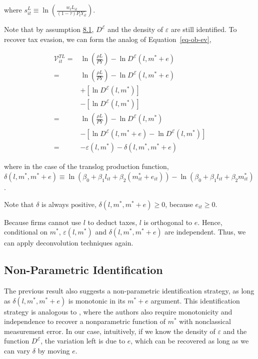 \documentclass[
  12pt]{article}
\theoremstyle{definition}
\theoremstyle{remark}
\begin{document}
where
\(s_{it}^{L} \equiv\ln\left(\frac{w_t L_{it}}{(1-\tau)P_{t}Y_{it}}\right)\).

Note that by assumption \hyperref[ass-non-ev]{8.1}, \(D^{\mathcal{E}}\)
and the density of \(\varepsilon\) are still identified. To recover tax
evasion, we can form the analog of Equation~\ref{eq-ob-ev},

\[
\begin{aligned}
\mathcal{V}_{it}^{TL} =&\ln\left(\frac{\rho L}{PY}\right)-\ln D^{\mathcal{E}}(l,m^*+e)\\
    =&\ln\left(\frac{\rho L}{PY}\right)-\ln D^{\mathcal{E}}(l,m^*+e)\\
    &+\left[\ln D^{\mathcal{E}}(l,m^*)\right]\\
    &-\left[\ln D^{\mathcal{E}}(l,m^*)\right] \\
    =&\ln\left(\frac{\rho L}{PY}\right)-\ln D^{\mathcal{E}}(l,m^*) \\
    &-\left[\ln D^{\mathcal{E}}(l,m^*+e)-\ln D^{\mathcal{E}}(l,m^*)\right]\\
    =& -\varepsilon(l,m^*) - \delta(l,m^*,m^*+e)
\end{aligned}
\]

where in the case of the translog production function,
\(\delta(l,m^*,m^*+e)\equiv \ln \left(\beta_0+\beta_1l_{it}+\beta_2(m^*_{it}+e_{it})\right)-\ln \left(\beta_0+\beta_1l_{it}+\beta_2m^*_{it}\right)\).

Note that \(\delta\) is always positive, \(\delta(l,m^*,m^*+e)\ge0\),
because \(e_{it}\ge0\).

Because firms cannot use \(l\) to deduct taxes, \(l\) is orthogonal to
\(e\). Hence, conditional on \(m^*\), \(\varepsilon(l,m^*)\) and
\(\delta(l,m^*,m^*+e)\) are independent. Thus, we can apply
deconvolution techniques again.

\subsection{Non-Parametric
Identification}\label{non-parametric-identification}

The previous result also suggests a non-parametric identification
strategy, as long as \(\delta(l,m^*,m^*+e)\) is monotonic in its
\(m^*+e\) argument. This identification strategy is analogous to
\citet{Hu2022b}, where the authors also require monotonicity and
independence to recover a nonparametric function of \(m^*\) with
nonclassical measurement error. In our case, intuitively, if we know the
density of \(\varepsilon\) and the function \(D^{\mathcal{E}}\), the
variation left is due to \(e\), which can be recovered as long as we can
vary \(\delta\) by moving \(e\).
\end{document}
